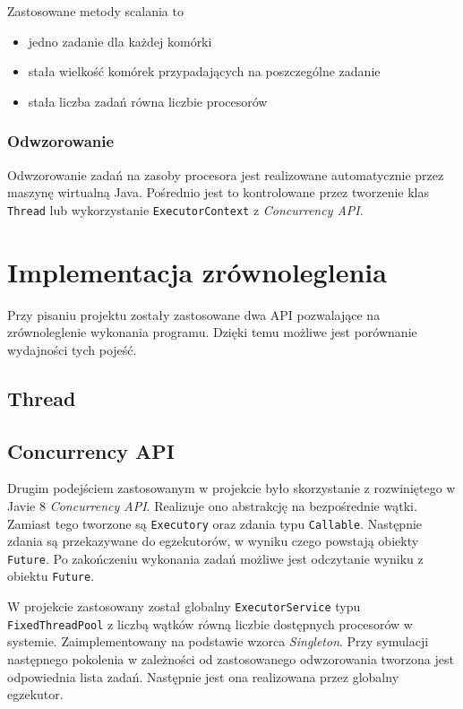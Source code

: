 \documentclass{mwart}
\begin{document}
Zastosowane metody scalania to
\begin{itemize}
  \item jedno zadanie dla każdej komórki
  \item stała wielkość komórek przypadających na poszczególne zadanie
  \item stała liczba zadań równa liczbie procesorów
\end{itemize}

\subsubsection{Odwzorowanie}
Odwzorowanie zadań na zasoby procesora jest realizowane automatycznie przez maszynę wirtualną Java. Pośrednio jest to kontrolowane przez tworzenie klas \texttt{Thread} lub wykorzystanie \texttt{ExecutorContext} z \textit{Concurrency API}.

\section{Implementacja zrównoleglenia}
Przy pisaniu projektu zostały zastosowane dwa API pozwalające na zrównoleglenie wykonania programu. Dzięki temu możliwe jest porównanie wydajności tych pojeść.

\subsection{Thread}

\subsection{Concurrency API}
Drugim podejściem zastosowanym w projekcie było skorzystanie z rozwiniętego w Javie 8 \textit{Concurrency API}. Realizuje ono abstrakcję na bezpośrednie wątki. Zamiast tego tworzone są \texttt{Executory} oraz zdania typu \texttt{Callable}. Następnie zdania są przekazywane do egzekutorów, w wyniku czego powstają obiekty \texttt{Future}. Po zakończeniu wykonania zadań możliwe jest odczytanie wyniku z obiektu \texttt{Future}.

W projekcie zastosowany został globalny \texttt{ExecutorService} typu \texttt{FixedThreadPool} z liczbą wątków równą liczbie dostępnych procesorów w systemie. Zaimplementowany na podstawie wzorca \textit{Singleton}.
Przy symulacji następnego pokolenia w zależności od zastosowanego odwzorowania tworzona jest odpowiednia lista zadań. Następnie jest ona realizowana przez globalny egzekutor.
\end{document}
